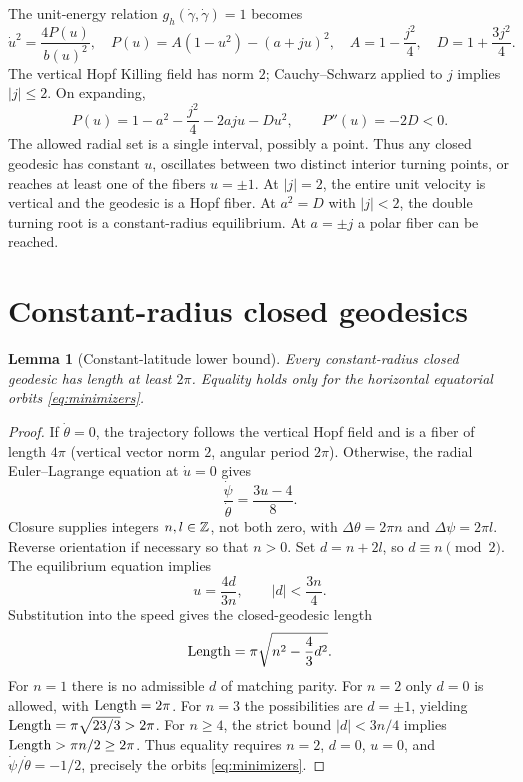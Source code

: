 \documentclass[11pt,a4paper]{article}
\newtheorem{lemma}[theorem]{Lemma}
\theoremstyle{remark}\newtheorem{remark}[theorem]{Remark}
\begin{document}
The unit-energy relation $g_h(\dot\gamma,\dot\gamma)=1$ becomes
\begin{equation}\label{eq:radial}
\boxed{\dot u^2=\frac{4P(u)}{b(u)^2},\quad P(u)=A(1-u^2)-(a+ju)^2,\quad A=1-\frac{j^2}{4},\quad D=1+\frac{3j^2}{4}.}
\end{equation}
The vertical Hopf Killing field has norm $2$; Cauchy--Schwarz applied to $j$ implies $|j|\leq2$. On expanding,
\begin{equation}\label{eq:quad}
P(u)=1-a^2-\frac{j^2}{4}-2aju-Du^2,\qquad P''(u)=-2D<0.
\end{equation}
The allowed radial set is a single interval, possibly a point. Thus any closed geodesic has constant $u$, oscillates between two distinct interior turning points, or reaches at least one of the fibers $u=\pm1$. At $|j|=2$, the entire unit velocity is vertical and the geodesic is a Hopf fiber. At $a^2=D$ with $|j|<2$, the double turning root is a constant-radius equilibrium. At $a=\pm j$ a polar fiber can be reached.

\section{Constant-radius closed geodesics}
\begin{lemma}[Constant-latitude lower bound]\label{lem:lat}
Every constant-radius closed geodesic has length at least $2\pi$. Equality holds only for the horizontal equatorial orbits \eqref{eq:minimizers}.
\end{lemma}
\begin{proof}
If $\dot\theta=0$, the trajectory follows the vertical Hopf field and is a fiber of length $4\pi$ (vertical vector norm $2$, angular period $2\pi$). Otherwise, the radial Euler--Lagrange equation at $\dot u=0$ gives
\[
\frac{\dot\psi}{\dot\theta}=\frac{3u-4}{8}.
\]
Closure supplies integers $n,l\in\mathbb Z$, not both zero, with $\Delta\theta=2\pi n$ and $\Delta\psi=2\pi l$. Reverse orientation if necessary so that $n>0$. Set $d=n+2l$, so $d\equiv n\pmod2$. The equilibrium equation implies
\[
u=\frac{4d}{3n},\qquad |d|<\frac{3n}{4}.
\]
Substitution into the speed gives the closed-geodesic length
\[
\operatorname{Length}=\pi\sqrt{n^2-\frac43d^2}.
\]
For $n=1$ there is no admissible $d$ of matching parity. For $n=2$ only $d=0$ is allowed, with $\operatorname{Length}=2\pi$. For $n=3$ the possibilities are $d=\pm1$, yielding $\operatorname{Length}=\pi\sqrt{23/3}>2\pi$. For $n\ge4$, the strict bound $|d|<3n/4$ implies $\operatorname{Length}>\pi n/2\ge2\pi$. Thus equality requires $n=2$, $d=0$, $u=0$, and $\dot\psi/\dot\theta=-1/2$, precisely the orbits \eqref{eq:minimizers}.
\end{proof}
\end{document}
